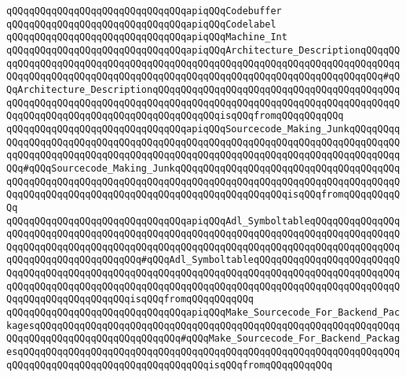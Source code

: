 \verb|qQQqqQQqqQQqqQQqqQQqqQQqqQQqqQQqapiqQQqCodebuffer|\newline
\verb|qQQqqQQqqQQqqQQqqQQqqQQqqQQqqQQqapiqQQqCodelabel|\newline
\verb|qQQqqQQqqQQqqQQqqQQqqQQqqQQqqQQqapiqQQqMachine_Int|\newline
\verb|qQQqqQQqqQQqqQQqqQQqqQQqqQQqqQQqapiqQQqArchitecture_DescriptionqQQqqQQqqQQqqQQqqQQqqQQqqQQqqQQqqQQqqQQqqQQqqQQqqQQqqQQqqQQqqQQqqQQqqQQqqQQqqQQqqQQqqQQqqQQqqQQqqQQqqQQqqQQqqQQqqQQqqQQqqQQqqQQqqQQqqQQqqQQqqQQq#qQQqArchitecture_DescriptionqQQqqQQqqQQqqQQqqQQqqQQqqQQqqQQqqQQqqQQqqQQqqQQqqQQqqQQqqQQqqQQqqQQqqQQqqQQqqQQqqQQqqQQqqQQqqQQqqQQqqQQqqQQqqQQqqQQqqQQqqQQqqQQqqQQqqQQqqQQqqQQqqQQqqQQqisqQQqfromqQQqqQQqqQQq|\newline
\verb|qQQqqQQqqQQqqQQqqQQqqQQqqQQqqQQqapiqQQqSourcecode_Making_JunkqQQqqQQqqQQqqQQqqQQqqQQqqQQqqQQqqQQqqQQqqQQqqQQqqQQqqQQqqQQqqQQqqQQqqQQqqQQqqQQqqQQqqQQqqQQqqQQqqQQqqQQqqQQqqQQqqQQqqQQqqQQqqQQqqQQqqQQqqQQqqQQqqQQqqQQq#qQQqSourcecode_Making_JunkqQQqqQQqqQQqqQQqqQQqqQQqqQQqqQQqqQQqqQQqqQQqqQQqqQQqqQQqqQQqqQQqqQQqqQQqqQQqqQQqqQQqqQQqqQQqqQQqqQQqqQQqqQQqqQQqqQQqqQQqqQQqqQQqqQQqqQQqqQQqqQQqqQQqqQQqqQQqqQQqisqQQqfromqQQqqQQqqQQq|\newline
\verb|qQQqqQQqqQQqqQQqqQQqqQQqqQQqqQQqapiqQQqAdl_SymboltableqQQqqQQqqQQqqQQqqQQqqQQqqQQqqQQqqQQqqQQqqQQqqQQqqQQqqQQqqQQqqQQqqQQqqQQqqQQqqQQqqQQqqQQqqQQqqQQqqQQqqQQqqQQqqQQqqQQqqQQqqQQqqQQqqQQqqQQqqQQqqQQqqQQqqQQqqQQqqQQqqQQqqQQqqQQqqQQqqQQq#qQQqAdl_SymboltableqQQqqQQqqQQqqQQqqQQqqQQqqQQqqQQqqQQqqQQqqQQqqQQqqQQqqQQqqQQqqQQqqQQqqQQqqQQqqQQqqQQqqQQqqQQqqQQqqQQqqQQqqQQqqQQqqQQqqQQqqQQqqQQqqQQqqQQqqQQqqQQqqQQqqQQqqQQqqQQqqQQqqQQqqQQqqQQqqQQqqQQqqQQqisqQQqfromqQQqqQQqqQQq|\newline
\verb|qQQqqQQqqQQqqQQqqQQqqQQqqQQqqQQqapiqQQqMake_Sourcecode_For_Backend_PackagesqQQqqQQqqQQqqQQqqQQqqQQqqQQqqQQqqQQqqQQqqQQqqQQqqQQqqQQqqQQqqQQqqQQqqQQqqQQqqQQqqQQqqQQqqQQqqQQq#qQQqMake_Sourcecode_For_Backend_PackagesqQQqqQQqqQQqqQQqqQQqqQQqqQQqqQQqqQQqqQQqqQQqqQQqqQQqqQQqqQQqqQQqqQQqqQQqqQQqqQQqqQQqqQQqqQQqqQQqqQQqqQQqisqQQqfromqQQqqQQqqQQq|\newline
